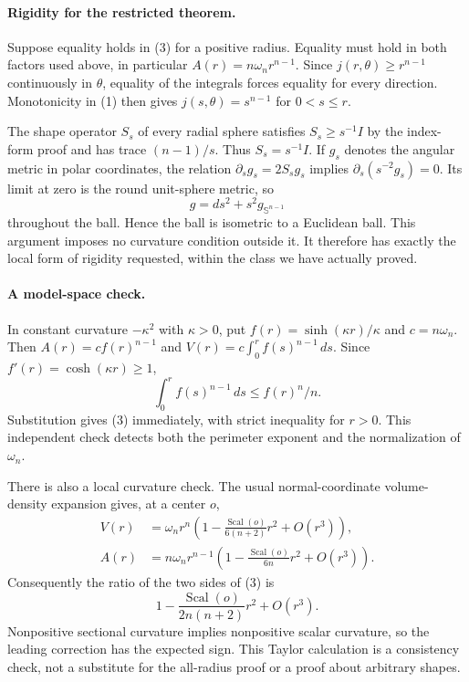 \documentclass[11pt]{article}
\begin{document}
\paragraph{Rigidity for the restricted theorem.}
Suppose equality holds in (3) for a positive radius. Equality must
hold in both factors used above, in particular
$A(r)=n\omega_n r^{n-1}$. Since
$j(r,\theta)\ge r^{n-1}$ continuously in $\theta$, equality of the
integrals forces equality for every direction. Monotonicity in (1)
then gives $j(s,\theta)=s^{n-1}$ for $0<s\le r$.

The shape operator $S_s$ of every radial sphere satisfies
$S_s\ge s^{-1}I$ by the index-form proof and has trace $(n-1)/s$.
Thus $S_s=s^{-1}I$. If $g_s$ denotes the angular metric in polar
coordinates, the relation $\partial_sg_s=2S_sg_s$ implies
$\partial_s(s^{-2}g_s)=0$. Its limit at zero is the round unit-sphere
metric, so
\[
                         g=ds^2+s^2g_{\mathbb S^{n-1}}
\]
throughout the ball. Hence the ball is isometric to a Euclidean ball.
This argument imposes no curvature condition outside it. It therefore
has exactly the local form of rigidity requested, within the class
we have actually proved.

\paragraph{A model-space check.}
In constant curvature $-\kappa^2$ with $\kappa>0$, put
$f(r)=\sinh(\kappa r)/\kappa$ and $c=n\omega_n$.
Then $A(r)=cf(r)^{n-1}$ and $V(r)=c\int_0^rf(s)^{n-1}\,ds$.
Since $f'(r)=\cosh(\kappa r)\ge1$,
\[
                  \int_0^rf(s)^{n-1}\,ds\le f(r)^n/n.
\]
Substitution gives (3) immediately, with strict inequality for $r>0$.
This independent check detects both the perimeter exponent and the
normalization of $\omega_n$.

There is also a local curvature check. The usual normal-coordinate
volume-density expansion gives, at a center $o$,
\[
 \begin{split}
 V(r)&=\omega_nr^n\left(1-
             \frac{\operatorname{Scal}(o)}{6(n+2)}r^2+O(r^3)\right),\\
 A(r)&=n\omega_nr^{n-1}\left(1-
             \frac{\operatorname{Scal}(o)}{6n}r^2+O(r^3)\right).
 \end{split}
\]
Consequently the ratio of the two sides of (3) is
\[
 1-\frac{\operatorname{Scal}(o)}{2n(n+2)}r^2+O(r^3).      \tag{4}
\]
Nonpositive sectional curvature implies nonpositive scalar curvature,
so the leading correction has the expected sign. This Taylor
calculation is a consistency check, not a substitute for the all-radius
proof or a proof about arbitrary shapes.
\end{document}
